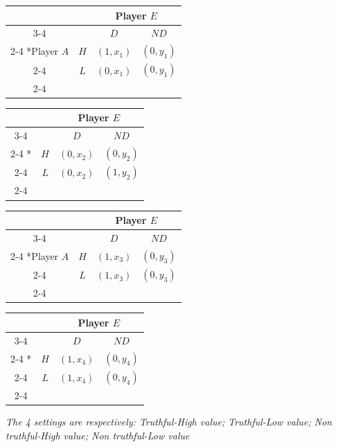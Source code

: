 \documentclass[10pt]{article}
\begin{document}
  \begin{table}[H]
  \begin{center}
    \setlength{\extrarowheight}{2pt}
    \begin{tabular}{*{4}{c|}}
      \multicolumn{2}{c}{} & \multicolumn{2}{c}{Player $E$}\\\cline{3-4}
      \multicolumn{1}{c}{} &  & $D$  & $ND$ \\\cline{2-4}
      \multirow{2}*{Player $A$}  & $H$ & $(1,x_1)$ & $(0,y_1)$ \\\cline{2-4}
      & $L$ & $(0,x_1)$ & $(0,y_1)$ \\\cline{2-4}
    \end{tabular}
            \begin{tabular}{*{4}{c|}}
      \multicolumn{2}{c}{} & \multicolumn{2}{c}{Player $E$}\\\cline{3-4}
      \multicolumn{1}{c}{} &  & $D$  & $ND$ \\\cline{2-4}
      \multirow{2}*{}  & $H$ & $(0,x_2)$ & $(0,y_2)$ \\\cline{2-4}
      & $L$ & $(0,x_2)$ & $(1,y_2)$ \\\cline{2-4}
    \end{tabular}
    \end{center}
  \end{table}
  
    \begin{table}[H]
      \begin{center}
    \setlength{\extrarowheight}{2pt}
        \begin{tabular}{*{4}{c|}}
      \multicolumn{2}{c}{} & \multicolumn{2}{c}{Player $E$}\\\cline{3-4}
      \multicolumn{1}{c}{} &  & $D$  & $ND$ \\\cline{2-4}
      \multirow{2}*{Player $A$}  & $H$ & $(1,x_3)$ & $(0,y_3)$ \\\cline{2-4}
      & $L$ & $(1,x_3)$ & $(0,y_3)$ \\\cline{2-4}
    \end{tabular}
        \begin{tabular}{*{4}{c|}}
      \multicolumn{2}{c}{} & \multicolumn{2}{c}{Player $E$}\\\cline{3-4}
      \multicolumn{1}{c}{} &  & $D$  & $ND$ \\\cline{2-4}
      \multirow{2}*{}  & $H$ & $(1,x_4)$ & $(0,y_4)$ \\\cline{2-4}
      & $L$ & $(1,x_4)$ & $(0,y_4)$ \\\cline{2-4}
    \end{tabular}
        \end{center}
   \footnotesize
    \textit{The 4 settings are respectively: Truthful-High value; Truthful-Low value; Non truthful-High value; Non truthful-Low value}         
  \end{table}
\end{document}
